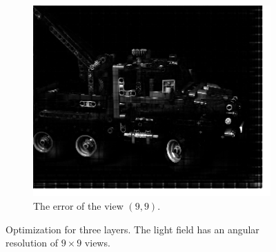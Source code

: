 \documentclass[11pt,a4paper,titlepage]{article}
\begin{document}
\begin{figure}[h]
\begin{subfigure}[t]{0.4\textwidth}
		\includegraphics[width=\textwidth]{results/legotruck_perspective_rec_3Layers_r=1/custom_view_error.png}
		\caption{The error of the view $\left( 9, 9 \right)$.}
	\end{subfigure}

	\caption{Optimization for three layers. The light field has an angular resolution of $9\times 9$ views.}
\end{figure}



\newpage


\end{document}
